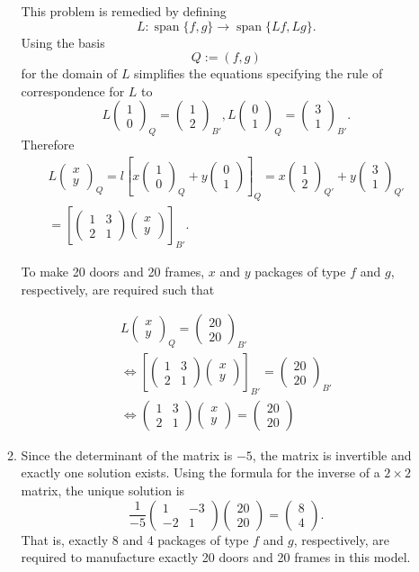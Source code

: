 \documentclass[12pt]{article}
\def\ba{\left(\begin{array}{cc}}
\def\ea{\end{array}\right) }
\def\bv{\left(\begin{array}{c}}
\def\ev{\end{array}\right) }
\def\LR{\Leftrightarrow}
\def\span{ \operatorname{span}}
\begin{document}
\begin{enumerate}
\begin{enumerate}
This  problem is remedied by defining 
\[L: \span \{ f,g \} \to  \span\{Lf,Lg\} .\] 
Using the basis 
\[ Q:=(f,g)\] 
for  the domain of $L$ simplifies the equations specifying the rule of correspondence for $L$ to 
\[L \bv 1\\0 \ev_Q = \bv 1\\2 \ev_{B'}, L\bv 0\\1 \ev_Q = \bv 3\\1 \ev_{B'}.\]
Therefore
\begin{gather*}L\bv x\\y \ev_Q= l \left[   x \bv 1\\0 \ev_Q+y \bv 0\\1 \ev \right]_{Q}
=x\bv 1\\2 \ev_{Q'} +y \bv 3\\1 \ev_{Q'}\\
= 
\left[       \ba 1&3\\2&1\ea \bv x\\y \ev 
\right]_{B'}.\end{gather*}

To make 20 doors and 20 frames, $x$ and $y$ packages of type $f$ and $g$, respectively, are required such that 

\begin{gather*}L\bv x\\y \ev_Q = \bv 20\\20 \ev_{B'}\\
\LR 
\left[       \ba 1&3\\2&1\ea \bv x\\y \ev 
\right]_{B'}= \bv 20\\20 \ev_{B'}
\\
\LR 
      \ba 1&3\\2&1\ea \bv x\\y \ev 
= \bv 20\\20 \ev
\end{gather*}
\item 
Since the determinant of the matrix is $-5$, the matrix is invertible and exactly one solution exists. Using the formula for the inverse of a $2\times 2$ matrix, the unique solution is
\[
\frac{1}{-5}   \ba1&-3 \\ -2&1 \ea \bv 20\\20 \ev = \bv 8 \\ 4 \ev.\] 
That is, exactly 8 and 4 packages of type $f$ and $g$, respectively, are required to manufacture exactly 20 doors and 20 frames in this model. \\


\end{enumerate}
\end{enumerate}
\end{document}

